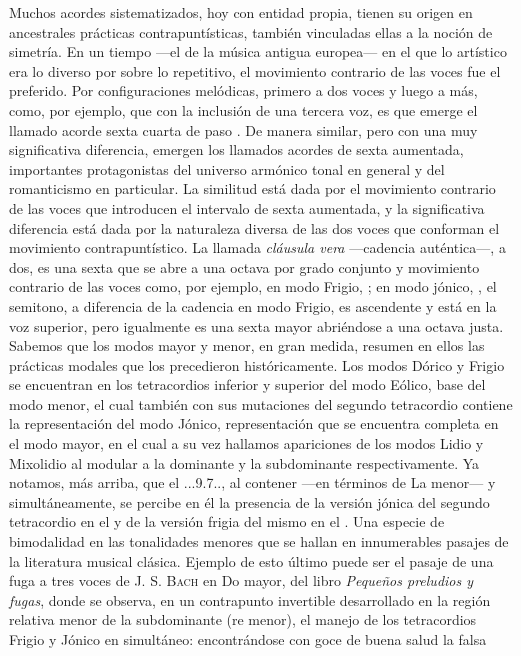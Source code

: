 \documentclass[a4paper,11pt]{article}
\begin{document}
\begin{multicols}{2}
Muchos acordes sistematizados, hoy con entidad propia, tienen su origen en ancestrales prácticas contrapuntísticas, también vinculadas ellas a la noción de simetría. En un tiempo ---el de la música antigua europea--- en el que lo artístico era lo diverso por sobre lo repetitivo, el movimiento contrario de las voces fue el preferido. Por configuraciones melódicas, primero a dos voces y luego a más, como, por ejemplo,  que con la inclusión de una tercera voz, es que emerge el llamado acorde sexta cuarta de paso \hbox{.} De manera similar, pero con una muy significativa diferencia, emergen los llamados acordes de sexta aumentada, importantes protagonistas del universo armónico tonal en general y del romanticismo en particular. La similitud está dada por el movimiento contrario de las voces que introducen el intervalo de sexta aumentada, y la significativa diferencia está dada por la naturaleza diversa de las dos voces que conforman el movimiento contrapuntístico. La llamada \emph{cláusula vera} ---cadencia auténtica---, a dos, es una sexta que se abre a una octava por grado conjunto y movimiento contrario de las voces como, por ejemplo, en modo Frigio, \hbox{;} en modo jónico, \hbox{,} el semitono, a diferencia de la cadencia en modo Frigio, es ascendente y está en la voz superior, pero igualmente es una sexta mayor abriéndose a una octava justa. Sabemos que los modos mayor y menor, en gran medida, resumen en ellos las prácticas modales que los precedieron históricamente. Los modos Dórico y Frigio se encuentran en los tetracordios inferior y superior del modo Eólico, base del modo menor, el cual también con sus mutaciones del segundo tetracordio contiene la representación del modo Jónico, representación que se encuentra completa en el modo mayor, en el cual a su vez hallamos apariciones de los modos Lidio y Mixolidio al modular a la dominante y la subdominante respectivamente. Ya notamos, más arriba, que el \acorde.\Dohne..9\bemoltxt.7.., al contener ---en términos de La menor---  y  simultáneamente, se percibe en él la presencia de la versión jónica del segundo tetracordio en el  y de la versión frigia del mismo en el . Una especie de bimodalidad en las tonalidades menores que se hallan en innumerables pasajes de la literatura musical clásica. Ejemplo de esto último puede ser el pasaje de una fuga a tres voces de \textsc{J. S. Bach} en Do mayor, del libro \emph{Pequeños preludios y fugas}, donde se observa, en un contrapunto invertible desarrollado en la región relativa menor de la subdominante (re menor), el manejo de los tetracordios Frigio y Jónico en simultáneo:  encontrándose con goce de buena salud la falsa 
\end{multicols}
\end{document}
